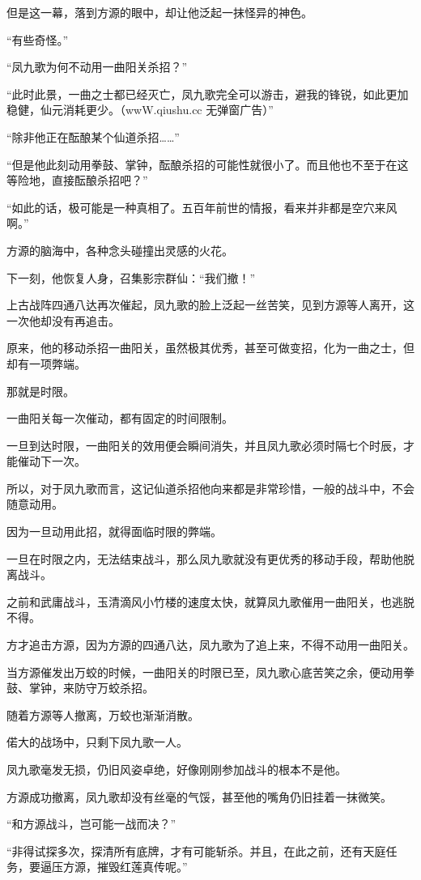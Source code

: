 \begin{this_body}
但是这一幕，落到方源的眼中，却让他泛起一抹怪异的神色。

“有些奇怪。”

“凤九歌为何不动用一曲阳关杀招？”

“此时此景，一曲之士都已经灭亡，凤九歌完全可以游击，避我的锋锐，如此更加稳健，仙元消耗更少。（wwW.qiushu.cc 无弹窗广告）”

“除非他正在酝酿某个仙道杀招……”

“但是他此刻动用拳鼓、掌钟，酝酿杀招的可能性就很小了。而且他也不至于在这等险地，直接酝酿杀招吧？”

“如此的话，极可能是一种真相了。五百年前世的情报，看来并非都是空穴来风啊。”

方源的脑海中，各种念头碰撞出灵感的火花。

下一刻，他恢复人身，召集影宗群仙：“我们撤！”

上古战阵四通八达再次催起，凤九歌的脸上泛起一丝苦笑，见到方源等人离开，这一次他却没有再追击。

原来，他的移动杀招一曲阳关，虽然极其优秀，甚至可做变招，化为一曲之士，但却有一项弊端。

那就是时限。

一曲阳关每一次催动，都有固定的时间限制。

一旦到达时限，一曲阳关的效用便会瞬间消失，并且凤九歌必须时隔七个时辰，才能催动下一次。

所以，对于凤九歌而言，这记仙道杀招他向来都是非常珍惜，一般的战斗中，不会随意动用。

因为一旦动用此招，就得面临时限的弊端。

一旦在时限之内，无法结束战斗，那么凤九歌就没有更优秀的移动手段，帮助他脱离战斗。

之前和武庸战斗，玉清滴风小竹楼的速度太快，就算凤九歌催用一曲阳关，也逃脱不得。

方才追击方源，因为方源的四通八达，凤九歌为了追上来，不得不动用一曲阳关。

当方源催发出万蛟的时候，一曲阳关的时限已至，凤九歌心底苦笑之余，便动用拳鼓、掌钟，来防守万蛟杀招。

随着方源等人撤离，万蛟也渐渐消散。

偌大的战场中，只剩下凤九歌一人。

凤九歌毫发无损，仍旧风姿卓绝，好像刚刚参加战斗的根本不是他。

方源成功撤离，凤九歌却没有丝毫的气馁，甚至他的嘴角仍旧挂着一抹微笑。

“和方源战斗，岂可能一战而决？”

“非得试探多次，探清所有底牌，才有可能斩杀。并且，在此之前，还有天庭任务，要逼压方源，摧毁红莲真传呢。”


\end{this_body}
